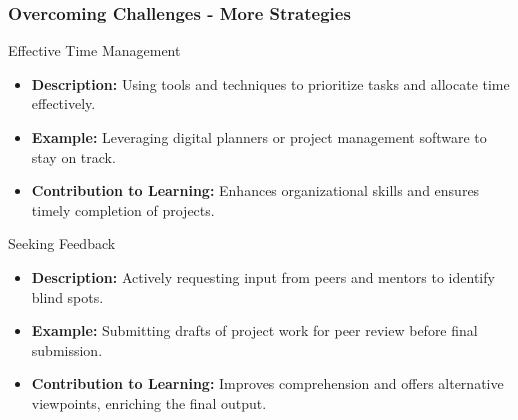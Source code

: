 \documentclass[aspectratio=169]{beamer}
\begin{document}
\begin{frame}[fragile]
    \frametitle{Overcoming Challenges - More Strategies}
    \begin{block}{Effective Time Management}
        \begin{itemize}
            \item \textbf{Description:} Using tools and techniques to prioritize tasks and allocate time effectively.
            \item \textbf{Example:} Leveraging digital planners or project management software to stay on track.
            \item \textbf{Contribution to Learning:} Enhances organizational skills and ensures timely completion of projects.
        \end{itemize}
    \end{block}

    \begin{block}{Seeking Feedback}
        \begin{itemize}
            \item \textbf{Description:} Actively requesting input from peers and mentors to identify blind spots.
            \item \textbf{Example:} Submitting drafts of project work for peer review before final submission.
            \item \textbf{Contribution to Learning:} Improves comprehension and offers alternative viewpoints, enriching the final output.
        \end{itemize}
    \end{block}
\end{frame}
\end{document}
